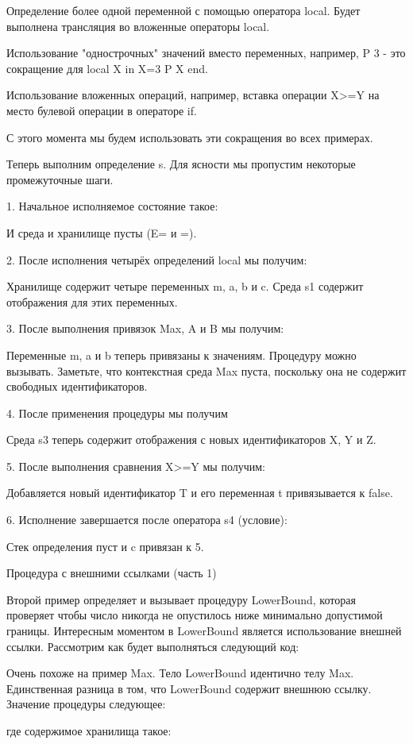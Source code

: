 Определение более одной переменной с помощью оператора local. Будет выполнена трансляция во вложенные операторы local.

Использование "однострочных" значений вместо переменных, например, {P 3} - это сокращение для local X in X=3 {P X} end.

Использование вложенных операций, например, вставка операции X>=Y на место булевой операции в операторе if.

С этого момента мы будем использовать эти сокращения во всех примерах.

Теперь выполним определение s. Для ясности мы пропустим некоторые промежуточные шаги.

1. Начальное исполняемое состояние такое:

И среда и хранилище пусты (E= и =).

2. После исполнения четырёх определений local мы получим:

Хранилище содержит четыре переменных m, a, b и c. Среда s1 содержит отображения для этих переменных.

3. После выполнения привязок Max, A и B мы получим:

Переменные m, a и b теперь привязаны к значениям. Процедуру можно вызывать. Заметьте, что контекстная среда Max пуста, поскольку она не содержит свободных идентификаторов.

4. После применения процедуры мы получим

Среда s3 теперь содержит отображения с новых идентификаторов X, Y и Z.

5. После выполнения сравнения X>=Y мы получим:

Добавляется новый идентификатор T и его переменная t привязывается к false.

6. Исполнение завершается после оператора s4 (условие):

Стек определения пуст и c привязан к 5.

Процедура с внешними ссылками (часть 1)

Второй пример определяет и вызывает процедуру LowerBound, которая проверяет чтобы число никогда не опустилось ниже минимально допустимой границы. Интересным моментом в LowerBound является использование внешней ссылки. Рассмотрим как будет выполняться следующий код:

Очень похоже на пример Max. Тело LowerBound идентично телу Max. Единственная разница в том, что LowerBound содержит внешнюю ссылку. Значение процедуры следующее:

где содержимое хранилища такое:

